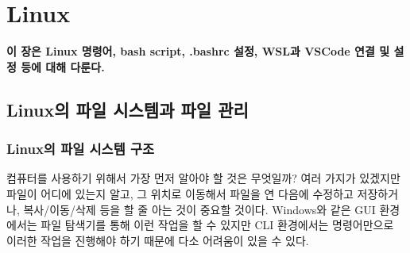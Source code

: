 
\graphicspath{{./chap2/images/}}
\chapter{Linux}
  
\textbf{이 장은 Linux 명령어, bash script, .bashrc 설정, WSL과 VSCode 연결 및 설정 등에 대해 다룬다.}

\section{Linux의 파일 시스템과 파일 관리}
\subsection{Linux의 파일 시스템 구조}
컴퓨터를 사용하기 위해서 가장 먼저 알아야 할 것은 무엇일까? 여러 가지가 있겠지만 파일이 어디에 있는지 알고, 그 위치로 이동해서 파일을 연 다음에 수정하고 저장하거나, 복사/이동/삭제 등을 할 줄 아는 것이 중요할 것이다. Windows와 같은 GUI 환경에서는 파일 탐색기를 통해 이런 작업을 할 수 있지만 CLI 환경에서는 명령어만으로 이러한 작업을 진행해야 하기 때문에 다소 어려움이 있을 수 있다.

